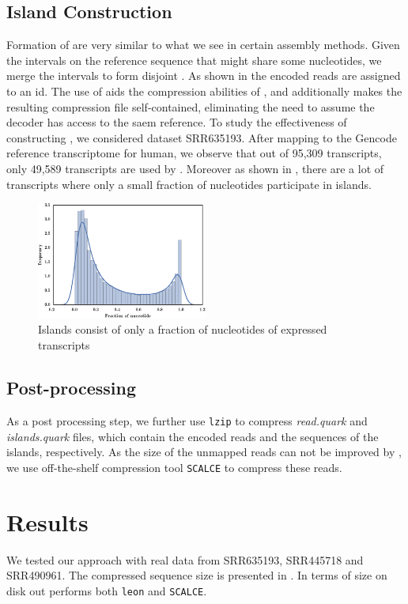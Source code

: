 \subsection{Island Construction}

Formation of \iss are very similar to what we see in certain assembly methods. Given the intervals on the reference sequence that might share some nucleotides, we merge the intervals to form disjoint \iss. As shown in  the encoded reads are assigned to an \is id. The use of \is aids the compression abilities of \quark, and additionally makes the resulting compression file self-contained, eliminating the need to assume the decoder has access to the saem reference. To study the effectiveness of constructing \iss, we considered dataset SRR635193. After mapping to the Gencode reference transcriptome for human, we observe that out of 95,309 transcripts, only 49,589 transcripts are used by \quark. Moreover as shown in , there are a lot of transcripts where only a small fraction of nucleotides participate in islands.  

\begin{figure}[!ht]
\includegraphics[width=0.5\textwidth]{Figures/ratio}
\centering
\caption{\label{fig:ratio}Islands consist of only a fraction of nucleotides of expressed transcripts}
\end{figure}

\subsection{Post-processing}
As a post processing step, we further use \texttt{lzip} to compress \textit{read.quark} and \textit{islands.quark} files, which contain the encoded reads and the sequences of the islands, respectively. As the size of the unmapped reads can not be improved by \qm, we use off-the-shelf \denovo compression tool \texttt{SCALCE} \citep{Hach2012} to compress these reads. 

\section{Results}
We tested our approach with real data from SRR635193, SRR445718 and SRR490961. The compressed sequence size is presented in . In terms of size on disk \quark out performs both \texttt{leon} and \texttt{SCALCE}. 

